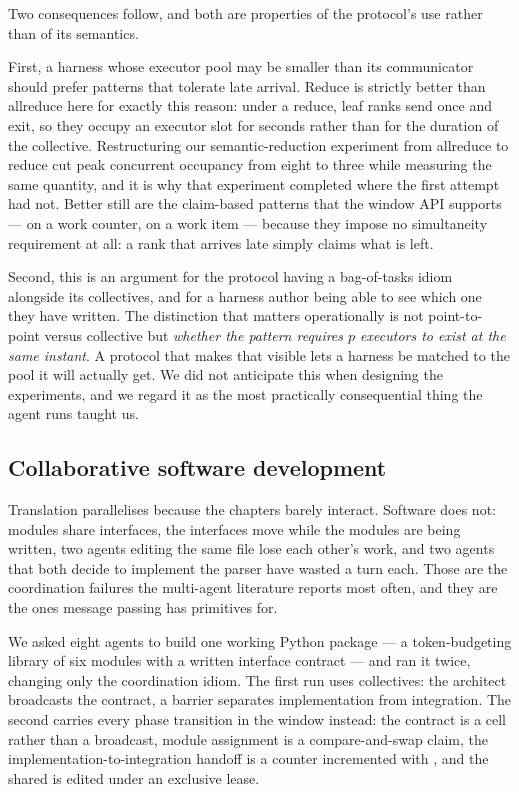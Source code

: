 Two consequences follow, and both are properties of the protocol's use rather
than of its semantics.

First, a harness whose executor pool may be smaller than its communicator
should prefer patterns that tolerate late arrival.  Reduce is strictly better
than allreduce here for exactly this reason: under a reduce, leaf ranks send
once and exit, so they occupy an executor slot for seconds rather than for the
duration of the collective.  Restructuring our semantic-reduction experiment
from allreduce to reduce cut peak concurrent occupancy from eight to three
while measuring the same quantity, and it is why that experiment completed
where the first attempt had not.  Better still are the claim-based patterns
that the window API supports ---  on a work counter,
 on a work item --- because they impose no simultaneity
requirement at all: a rank that arrives late simply claims what is left.

Second, this is an argument for the protocol having a bag-of-tasks idiom
alongside its collectives, and for a harness author being able to see which one
they have written.  The distinction that matters operationally is not
point-to-point versus collective but \emph{whether the pattern requires $p$
executors to exist at the same instant}.  A protocol that makes that visible
lets a harness be matched to the pool it will actually get.  We did not
anticipate this when designing the experiments, and we regard it as the most
practically consequential thing the agent runs taught us.

\subsection{Collaborative software development}
\label{sec:eval-software}

Translation parallelises because the chapters barely interact.  Software does
not: modules share interfaces, the interfaces move while the modules are being
written, two agents editing the same file lose each other's work, and two
agents that both decide to implement the parser have wasted a turn each.  Those
are the coordination failures the multi-agent literature reports most often,
and they are the ones message passing has primitives for.

We asked eight agents to build one working Python package --- a token-budgeting
library of six modules with a written interface contract --- and ran it twice,
changing only the coordination idiom.  The first run uses collectives: the
architect broadcasts the contract, a barrier separates implementation from
integration.  The second carries every phase transition in the window instead:
the contract is a cell rather than a broadcast, module assignment is a
compare-and-swap claim, the implementation-to-integration handoff is a counter
incremented with , and the shared
 is edited under an exclusive lease.

